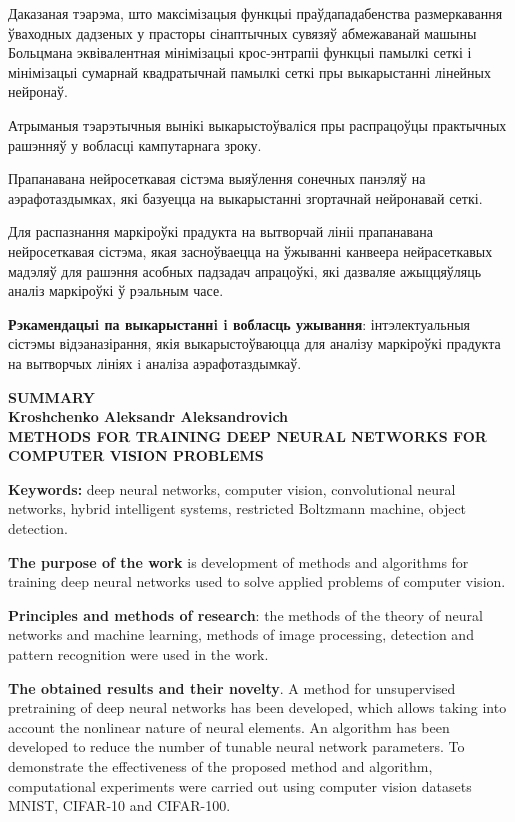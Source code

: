 \documentclass{thesisby}
\begin{document}
Даказаная тэарэма, што максімізацыя функцыі пра\u{у}дападабенства размеркавання \u{у}ваходных дадзеных у прасторы сінаптычных сувязя\u{у} абмежаванай машыны Больцмана эквівалентная мінімізацыі крос-энтрапіі функцыі памылкі сеткі і мінімізацыі сумарнай квадратычнай памылкі сеткі пры выкарыстанні лінейных нейрона\u{у}.

Атрыманыя тэарэтычныя вынікі выкарысто\u{у}валіся пры распрацо\u{у}цы практычных рашэння\u{у} у вобласці кампутарнага зроку.

Прапанавана нейросеткавая сістэма выяўлення сонечных панэля\u{у} на аэрафотаздымках, які базуецца на выкарыстанні згортачнай нейронавай сеткі.

Для распазнання маркіро\u{у}кі прадукта на вытворчай лініі прапанавана нейросеткавая сістэма, якая засно\u{у}ваецца на \u{у}жыванні канвеера нейрасеткавых мадэля\u{у} для рашэння асобных падзадач апрацо\u{у}кі, які дазваляе ажыцця\u{у}ляць аналіз маркіро\u{у}кі \u{у} рэальным часе.
	
\textbf{Рэкамендацыi па выкарыстаннi i вобласць ужывання}:
інтэлектуальныя сістэмы відэаназірання, якія выкарысто\u{у}ваюцца для аналізу маркіро\u{у}кі прадукта на вытворчых лініях i аналіза аэрафотаздымка\u{у}.

\newpage
\begin{center}
\bf SUMMARY\\[1mm]\rm Kroshchenko Aleksandr Aleksandrovich\\[1mm] \bf
METHODS FOR TRAINING DEEP NEURAL NETWORKS FOR COMPUTER VISION PROBLEMS
\end{center}

{\bf Keywords:} deep neural networks, computer vision, convolutional neural networks, hybrid intelligent systems, restricted Boltzmann machine, object detection.

\textbf{The purpose of the work } is development of methods and algorithms for training deep neural networks used to solve applied problems of computer vision.

\textbf{Principles and methods of research}: the methods of the theory of neural networks and machine learning, methods of image processing, detection and pattern recognition were used in the work.

\textbf{The obtained results and their novelty}.
A method for unsupervised pretraining of deep neural networks has been developed, which allows taking into account the nonlinear nature of neural elements. An algorithm has been developed to reduce the number of tunable neural network parameters. To demonstrate the effectiveness of the proposed method and algorithm, computational experiments were carried out using computer vision datasets MNIST, CIFAR-10 and CIFAR-100.
\end{document}
